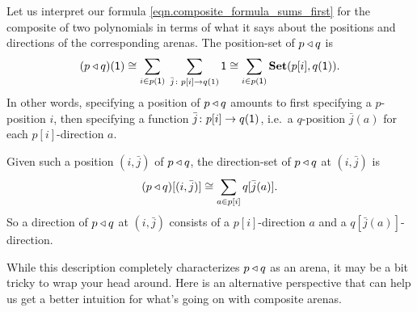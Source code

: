 \documentclass[Book-Poly]{subfiles}
\begin{document}
Let us interpret our formula \eqref{eqn.composite_formula_sums_first} for the composite of two polynomials in terms of what it says about the positions and directions of the corresponding arenas.
The position-set of $p \mathbin{\triangleleft} q$ is
\begin{equation} \label{eqn.comp_pos}
    (p \mathbin{\triangleleft} q)(\textsf{1}) \cong \sum_{i \in p(\textsf{1})} \; \sum_{\bar{j} \colon p[i] \to q(1)} \textsf{1} \cong \sum_{i \in p(\textsf{1})} \mathbf{Set}(p[i], q(\textsf{1})).
\end{equation}
In other words, specifying a position of $p \mathbin{\triangleleft} q$ amounts to first specifying a $p$-position $i$, then specifying a function $\bar{j} \colon p[i] \to q(\textsf{1})$, i.e.\ a $q$-position $\bar{j}(a)$ for each $p[i]$-direction $a$.

Given such a position $(i, \bar{j})$ of $p \mathbin{\triangleleft} q$, the direction-set of $p \mathbin{\triangleleft} q$ at $(i, \bar{j})$ is
\begin{equation} \label{eqn.comp_dir}
    (p \mathbin{\triangleleft} q)[(i, \bar{j})] \cong \sum_{a \in p[i]} q[\bar{j}(a)].
\end{equation}
So a direction of $p \mathbin{\triangleleft} q$ at $(i, \bar{j})$ consists of a $p[i]$-direction $a$ and a $q[\bar{j}(a)]$-direction.

While this description completely characterizes $p \mathbin{\triangleleft} q$ as an arena, it may be a bit tricky to wrap your head around.
Here is an alternative perspective that can help us get a better intuition for what's going on with composite arenas.
\end{document}
